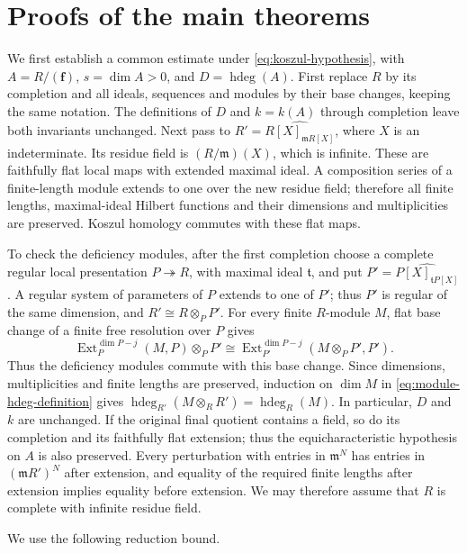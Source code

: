 \documentclass[11pt,reqno]{amsart}
\numberwithin{equation}{section}
\theoremstyle{definition}
\newcommand{\m}{\mathfrak m}
\newcommand{\f}{\mathbf f}
\newcommand{\hdeg}{\operatorname{hdeg}}
\newcommand{\Ext}{\operatorname{Ext}}
\begin{document}
\section{Proofs of the main theorems}\label{sec:main-proof}

We first establish a common estimate under \eqref{eq:koszul-hypothesis},
with $A=R/(\f)$, $s=\dim A>0$, and $D=\hdeg(A)$.
First replace $R$ by its
completion and all ideals, sequences and modules by their base changes,
keeping the same notation. The definitions of $D$ and $k=k(A)$
through completion leave both invariants unchanged. Next pass to
$R'=\widehat{R[X]_{\m R[X]}}$, where $X$ is an indeterminate.
Its residue field is $(R/\m)(X)$, which is infinite.
These are faithfully flat local maps with extended maximal ideal.
A composition series of a finite-length module extends to one over
the new residue field; therefore all finite lengths, maximal-ideal Hilbert
functions and their dimensions and multiplicities are preserved.
Koszul homology commutes with these flat maps.

To check the deficiency modules, after the first completion choose
a complete regular local presentation $P\twoheadrightarrow R$, with
maximal ideal $\mathfrak t$, and put
$P'=\widehat{P[X]_{\mathfrak tP[X]}}$.
A regular system of parameters of $P$ extends to one of $P'$;
thus $P'$ is regular of the same dimension, and $R'\cong R\otimes_PP'$.
For every finite $R$-module $M$, flat base change of a finite free
resolution over $P$ gives
\[
 \Ext_P^{\dim P-j}(M,P)\otimes_PP'
 \cong \Ext_{P'}^{\dim P-j}(M\otimes_PP',P').
\]
Thus the deficiency modules commute with this base change. Since
dimensions, multiplicities and finite lengths are preserved, induction
on $\dim M$ in \eqref{eq:module-hdeg-definition} gives
$\hdeg_{R'}(M\otimes_RR')=\hdeg_R(M)$. In particular, $D$ and $k$
are unchanged. If the original final quotient contains a field,
so do its completion and its faithfully flat extension; thus the
equicharacteristic hypothesis on $A$ is also preserved.
Every perturbation with entries in $\m^N$ has entries
in $(\m R')^N$ after extension, and equality of the required finite
lengths after extension implies equality before extension. We may
therefore assume that $R$ is complete with infinite residue field.

We use the following reduction bound.
\end{document}
